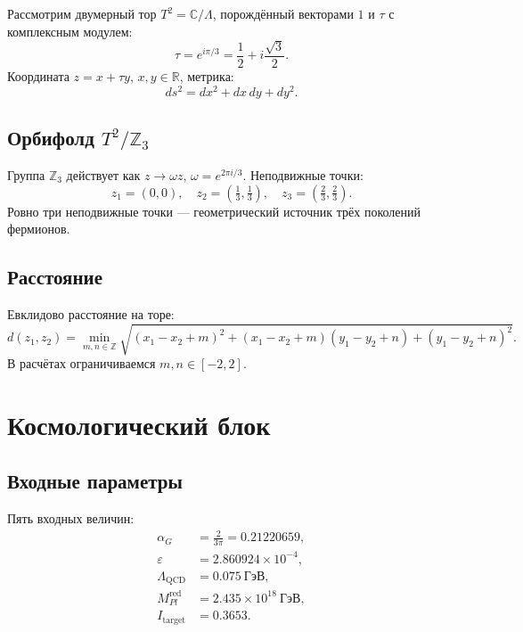 \documentclass[11pt,a4paper]{article}
\numberwithin{equation}{section}
\begin{document}
Рассмотрим двумерный тор $T^2 = \mathbb{C}/\Lambda$,
порождённый векторами $1$ и $\tau$ с комплексным
модулем:
\begin{equation}
\tau = e^{i\pi/3} = \frac{1}{2} + i\frac{\sqrt{3}}{2}.
\end{equation}
Координата $z = x + \tau y$, $x,y \in \mathbb{R}$,
метрика:
\begin{equation}
ds^2 = dx^2 + dx\,dy + dy^2.
\end{equation}

\subsection{Орбифолд $T^2/\mathbb{Z}_3$}

Группа $\mathbb{Z}_3$ действует как
$z \to \omega z$, $\omega = e^{2\pi i/3}$.
Неподвижные точки:
\begin{equation}
z_1 = (0,0), \quad z_2 = \left(\tfrac{1}{3},\tfrac{1}{3}\right),
\quad z_3 = \left(\tfrac{2}{3},\tfrac{2}{3}\right).
\label{eq:fixed_points}
\end{equation}
Ровно три неподвижные точки --- геометрический
источник трёх поколений фермионов.

\subsection{Расстояние}

Евклидово расстояние на торе:
\begin{equation}
d(z_1,z_2) = \min_{m,n\in\mathbb{Z}}
\sqrt{(x_1-x_2+m)^2 + (x_1-x_2+m)(y_1-y_2+n) + (y_1-y_2+n)^2}.
\end{equation}
В расчётах ограничиваемся $m,n \in [-2,2]$.

\section{Космологический блок}

\subsection{Входные параметры}

Пять входных величин:
\begin{align}
\alpha_G &= \frac{2}{3\pi} = 0.21220659, \\
\varepsilon &= 2.860924 \times 10^{-4}, \\
\Lambda_{\text{QCD}} &= 0.075~\text{ГэВ}, \\
M_{Pl}^{\text{red}} &= 2.435 \times 10^{18}~\text{ГэВ}, \\
I_{\text{target}} &= 0.3653.
\end{align}
\end{document}
